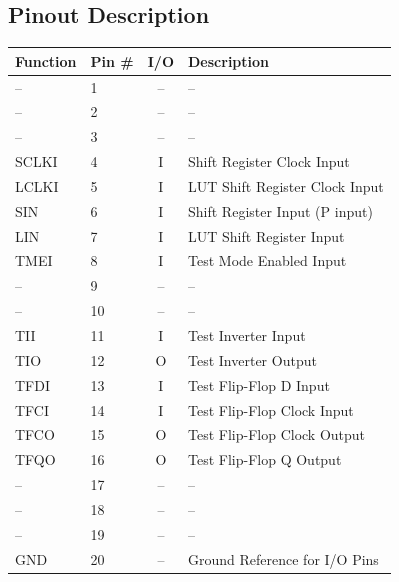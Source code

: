 \documentclass[a4paper]{article}
\begin{document}
\subsection{\textbf{Pinout Description}}
    \begin{table}[H]
        \centering
        \begin{tabular}{| l | l | c | p{10cm}|}
            \hline
            \textbf{Function}   & \textbf{Pin \#}       & \textbf{I/O}          &\textbf{Description}\\ \hline
                --              & 1                & --           & -- \\ \hline
                --              & 2                & --           & -- \\ \hline
                --              & 3                & --           & -- \\ \hline
                SCLKI           & 4                & I            & Shift Register Clock Input \\ \hline
                LCLKI           & 5                & I            & LUT Shift Register Clock Input \\ \hline
                SIN             & 6                & I            & Shift Register Input (P input) \\ \hline
                LIN             & 7                & I            & LUT Shift Register Input \\ \hline
                TMEI            & 8                & I            & Test Mode Enabled Input   \\ \hline
                --              & 9                & --           & -- \\ \hline
                --              & 10               & --           & -- \\ \hline

                TII             & 11               & I            & Test Inverter Input \\ \hline
                TIO             & 12               & O            & Test Inverter Output \\ \hline
                TFDI            & 13               & I            & Test Flip-Flop D Input \\ \hline
                TFCI            & 14               & I            & Test Flip-Flop Clock Input \\ \hline
                TFCO            & 15               & O            & Test Flip-Flop Clock Output \\ \hline
                TFQO            & 16               & O            & Test Flip-Flop Q Output \\ \hline
                --              & 17               & --           & -- \\ \hline
                --              & 18               & --           & -- \\ \hline
                --              & 19               & --           & -- \\ \hline
                GND             & 20               & --           & Ground Reference for I/O Pins \\ \hline


\end{tabular}
\end{table}
\end{document}
